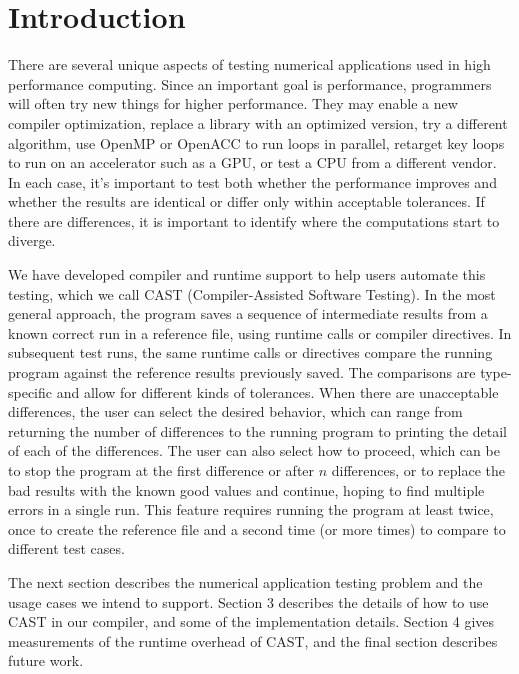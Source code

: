 \section{Introduction}

There are several unique aspects of testing numerical applications used in high performance computing.
Since an important goal is performance, programmers will often try new things for higher performance.
They may enable a new compiler optimization, replace a library with an optimized version, try a different algorithm, use OpenMP or OpenACC to run loops in parallel, retarget key loops to run on an accelerator such as a GPU, or test a CPU from a different vendor.
In each case, it's important to test both whether the performance improves and whether the results are identical or differ only within acceptable tolerances.
If there are differences, it is important to identify where the computations start to diverge.

We have developed compiler and runtime support to help users automate this testing, which we call CAST (Compiler-Assisted Software Testing).
In the most general approach, the program saves a sequence of intermediate results from a known correct run in a reference file, using runtime calls or compiler directives.
In subsequent test runs, the same runtime calls or directives compare the running program against the reference results previously saved.
The comparisons are type-specific and allow for different kinds of tolerances.
When there are unacceptable differences, the user can select the desired behavior, which can range from returning the number of differences to the running program to printing the detail of each of the differences.
The user can also select how to proceed, which can be to stop the program at the first difference or after $n$ differences, or to replace the bad results with the known good values and continue, hoping to find multiple errors in a single run.
This feature requires running the program at least twice, once to create the reference file and a second time (or more times) to compare to different test cases.

The next section describes the numerical application testing problem and the usage cases we intend to support.
Section 3 describes the details of how to use CAST in our compiler, and some of the implementation details.
Section 4 gives measurements of the runtime overhead of CAST, and the final section describes future work.
